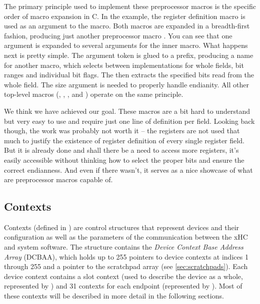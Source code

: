 The primary principle used to implement these preprocessor macros is the
specific order of macro expansion in C. In the example, the register definition
macro is used as an argument to the  macro. Both macros are
expanded in a breadth-first fashion, producing just another preprocessor macro
. You can see
that one argument is expanded to several arguments for the inner macro. What
happens next is pretty simple. The  argument token is glued to
a prefix, producing a name for another macro, which selects between
implementations for whole fields, bit ranges and individual bit flags. The
 then extracts the specified bits read from the whole
field. The size argument is needed to properly handle endianity. All other
top-level macros (, ,
,  and ) operate
on the same principle.

We think we have achieved our goal. These macros are a bit hard to understand but
very easy to use and require just one line of definition per field. Looking
back though, the work was probably not worth it -- the registers are not used
that much to justify the existence of register definition of every single register
field. But it is already done and shall there be a need to access more registers,
it's easily accessible without thinking how to select the proper bits and
ensure the correct endianness. And even if there wasn't, it serves as a nice
showcase of what are preprocessor macros capable of.

\subsection{Contexts}

Contexts (defined in )
are control structures that represent devices and their configuration as well
as the parameters of the communication between the xHC and system software. The
 structure contains the \textit{Device Context Base Address Array} (DCBAA), which
holds up to 255 pointers to device contexts at indices 1 through 255 and a pointer to
the scratchpad array (see \ref{sec:scratchpads}). Each device context contains a slot
context (used to describe the device as a whole, represented by ) and
31 contexts for each endpoint (represented by ). Most of these contexts
will be described in more detail in the following sections.

